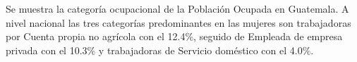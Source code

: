 Se muestra la categoría ocupacional de la Población Ocupada en Guatemala. A nivel nacional las tres categorías predominantes en las mujeres son trabajadoras por Cuenta propia no agrícola con el 12.4\%, seguido de Empleada de empresa privada con el 10.3\% y trabajadoras de Servicio doméstico con el 4.0\%.
